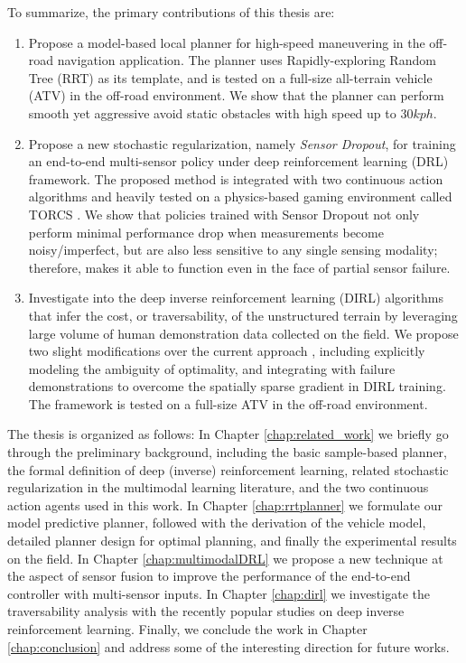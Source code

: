 \documentclass[../thesis.tex]{subfiles}
\begin{document}
To summarize, the primary contributions of this thesis are:
\begin{enumerate}
 
    \item %
    Propose a model-based local planner for high-speed maneuvering in the off-road navigation application. 
    The planner uses Rapidly-exploring Random Tree (RRT) \cite{kuffner2000rrt} as its template, and is tested on a full-size all-terrain vehicle (ATV) in the off-road environment. 
    We show that the planner can perform smooth yet aggressive avoid static obstacles with high speed up to $30 kph$.
 
    \item %
    Propose a new stochastic regularization, namely \emph{Sensor Dropout}, for training an end-to-end multi-sensor policy under deep reinforcement learning (DRL) framework. 
    The proposed method is integrated with two continuous action algorithms and heavily tested on a physics-based gaming environment called TORCS \cite{wymann2000torcs}. 
    We show that policies trained with Sensor Dropout not only perform minimal performance drop when measurements become noisy/imperfect, but are also less sensitive to any single sensing modality; therefore, makes it able to function even in the face of partial sensor failure.
 
    \item %
    Investigate into the deep inverse reinforcement learning (DIRL) algorithms that infer the cost, or traversability, of the unstructured terrain by leveraging large volume of human demonstration data collected on the field. 
    We propose two slight modifications over the current approach \cite{wulfmeier2015maximum}, including explicitly modeling the ambiguity of optimality, and integrating with failure demonstrations to overcome the spatially sparse gradient in DIRL training.
    The framework is tested on a full-size ATV in the off-road environment.
 
\end{enumerate}
 
The thesis is organized as follows:
In Chapter \ref{chap:related_work} we briefly go through the preliminary background, including the basic sample-based planner, the formal definition of deep (inverse) reinforcement learning, related stochastic regularization in the multimodal learning literature, and the two continuous action agents used in this work.
In Chapter \ref{chap:rrtplanner} we formulate our model predictive planner, followed with the derivation of the vehicle model, detailed planner design for optimal planning, and finally the experimental results on the field.
In Chapter \ref{chap:multimodalDRL} we propose a new technique at the aspect of sensor fusion to improve the performance of the end-to-end controller with multi-sensor inputs. 
In Chapter \ref{chap:dirl} we investigate the traversability analysis with the recently popular studies on deep inverse reinforcement learning.
Finally, we conclude the work in Chapter \ref{chap:conclusion} and address some of the interesting direction for future works.
 
\end{document}

